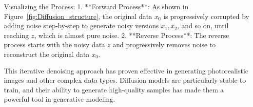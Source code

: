 Visualizing the Process:
1. **Forward Process**: As shown in Figure~\ref{fig:Diffusion_structure}, the original data \(x_0\) is progressively corrupted by adding noise step-by-step to generate noisy versions \(x_1, x_2\), and so on, until reaching \(z\), which is almost pure noise.
2. **Reverse Process**: The reverse process starts with the noisy data \(z\) and progressively removes noise to reconstruct the original data \(x_0\).

This iterative denoising approach has proven effective in generating photorealistic images and other complex data types. Diffusion models are particularly stable to train, and their ability to generate high-quality samples has made them a powerful tool in generative modeling.